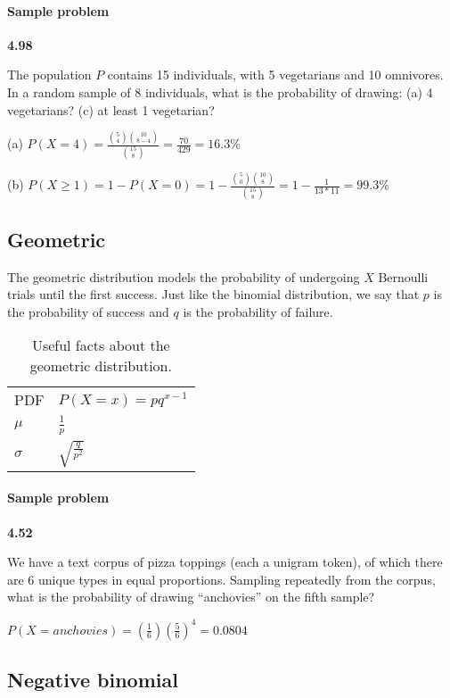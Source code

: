 \documentclass[11pt,letterpaper]{scrartcl}
\begin{document}
\paragraph{Sample problem}

\textbf{4.98}

The population $P$ contains 15 individuals, with 5 vegetarians and 10 omnivores.
In a random sample of 8 individuals, what is the probability of drawing: 
(a) 4 vegetarians?
(c) at least 1 vegetarian?

(a) $P(X=4) = \frac{\binom{5}{4}\binom{10}{8-4}}{\binom{15}{8}} = \frac{70}{429} = 16.3\%$

(b) $P(X \geq 1) = 1 - P(X=0) = 1 - \frac{\binom{5}{0}\binom{10}{8}}{\binom{15}{8}} = 1 - \frac{1}{13*11} = 99.3\%$

\subsection{Geometric}

The geometric distribution models the probability of undergoing $X$ Bernoulli trials until the first success.
Just like the binomial distribution, we say that $p$ is the probability of success and $q$ is the probability of failure.

\begin{table}[h!]
\centering
\begin{tabular}{l l} \hline
PDF & $P(X=x)= pq^{x-1}$ \\
$\mu $ & $\frac{1}{p}$ \\
$\sigma $ & $\sqrt{\frac{q}{p^{2}}}$ \\ \hline
\end{tabular}
\caption{Useful facts about the geometric distribution.}
\label{tab:geometric}
\end{table}

\paragraph{Sample problem}

\textbf{4.52}

We have a text corpus of pizza toppings (each a unigram token), of which there are 6 unique types in equal proportions.
Sampling repeatedly from the corpus, what is the probability of drawing ``anchovies'' on the fifth sample?

$P(X=anchovies) = (\frac{1}{6})(\frac{5}{6})^{4} = 0.0804$

\subsection{Negative binomial}
\end{document}
